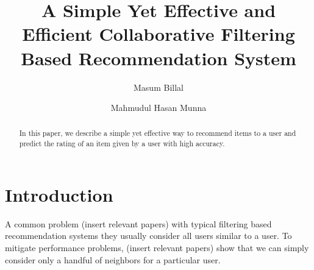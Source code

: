 \documentclass{article}
\title{\bfseries A Simple Yet Effective and Efficient Collaborative Filtering Based Recommendation System}
\author{Masum Billal\and Mahmudul Hasan Munna}
\begin{document}
	\maketitle
		\begin{abstract}
			In this paper, we describe a simple yet effective way to recommend items to a user and predict the rating of an item given by a user with high accuracy.
		\end{abstract}
	\section{Introduction}
	A common problem (insert relevant papers) with typical filtering based recommendation systems they usually consider all users similar to a user. To mitigate performance problems, (insert relevant papers) show that we can simply consider only a handful of neighbors for a particular user.
\end{document}
